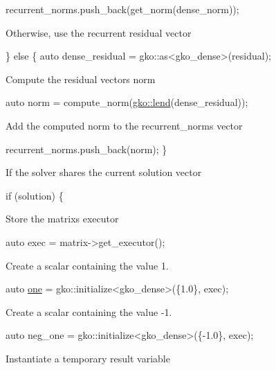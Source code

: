\begin{DoxyCode}
recurrent\_norms.push\_back(get\_norm(dense\_norm));
\end{DoxyCode}


Otherwise, use the recurrent residual vector


\begin{DoxyCode}
\} \textcolor{keywordflow}{else} \{
    \textcolor{keyword}{auto} dense\_residual = gko::as<gko\_dense>(residual);
\end{DoxyCode}


Compute the residual vector\textquotesingle{}s norm


\begin{DoxyCode}
\textcolor{keyword}{auto} norm = compute\_norm(\hyperlink{namespacegko_aa8cb4876b72e5e1036ea9575443c439b}{gko::lend}(dense\_residual));
\end{DoxyCode}


Add the computed norm to the {\ttfamily recurrent\+\_\+norms} vector


\begin{DoxyCode}
    recurrent\_norms.push\_back(norm);
\}
\end{DoxyCode}


If the solver shares the current solution vector


\begin{DoxyCode}
\textcolor{keywordflow}{if} (solution) \{
\end{DoxyCode}


Store the matrix\textquotesingle{}s executor


\begin{DoxyCode}
\textcolor{keyword}{auto} exec = matrix->get\_executor();
\end{DoxyCode}


Create a scalar containing the value 1.


\begin{DoxyCode}
\textcolor{keyword}{auto} \hyperlink{namespacegko_a0059e27f8f4bc348ff65c1e60caf47c8}{one} = gko::initialize<gko\_dense>(\{1.0\}, exec);
\end{DoxyCode}


Create a scalar containing the value -\/1.


\begin{DoxyCode}
\textcolor{keyword}{auto} neg\_one = gko::initialize<gko\_dense>(\{-1.0\}, exec);
\end{DoxyCode}


Instantiate a temporary result variable


